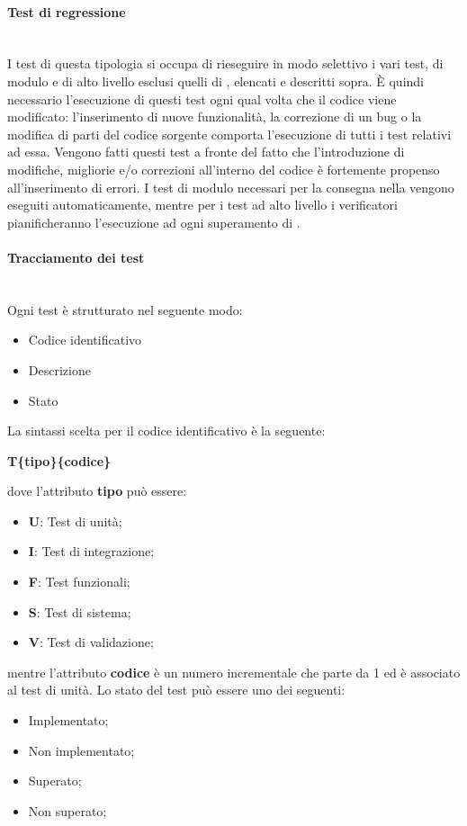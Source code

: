 \paragraph{Test di regressione}\mbox{}\\[0.4cm]
I test di questa tipologia si occupa di rieseguire in modo selettivo i vari test, di modulo e di alto livello esclusi quelli di , elencati e descritti sopra. 
È quindi necessario l'esecuzione di questi test ogni qual volta che il codice viene modificato: l'inserimento di nuove funzionalità, la correzione di un bug o la modifica di parti del codice sorgente comporta l'esecuzione di tutti i test relativi ad essa. Vengono fatti questi test a fronte del fatto che l'introduzione di modifiche, migliorie e/o correzioni all'interno del codice è fortemente propenso all'inserimento di errori. I test di modulo necessari per la consegna nella  vengono eseguiti automaticamente, mentre per i test ad alto livello i verificatori pianificheranno l'esecuzione ad ogni superamento di .
\paragraph{Tracciamento dei test}\mbox{}\\[0.4cm]
Ogni test è strutturato nel seguente modo:
\begin{itemize}
	\item Codice identificativo
	\item Descrizione
	\item Stato
\end{itemize}
La sintassi scelta per il codice identificativo è la seguente:
\begin{center}
	\textbf{T\{tipo\}\{codice\}}
\end{center}
dove l'attributo \textbf{tipo} può essere:
\begin{itemize}
	\item \textbf{U}: Test di unità;
	\item \textbf{I}: Test di integrazione;
	\item \textbf{F}: Test funzionali;
	\item \textbf{S}: Test di sistema;
	\item \textbf{V}: Test di validazione;
\end{itemize}
mentre l'attributo \textbf{codice} è un numero incrementale che parte da 1 ed è associato al test di unità. Lo stato del test può essere uno dei seguenti:
\begin{itemize}
	\item Implementato;
	\item Non implementato;
	\item Superato;
	\item Non superato;
\end{itemize}
